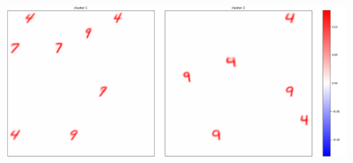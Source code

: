 \documentclass[a4paper]{report}
\begin{document}
\begin{figure} [H]
    \centering
    \includegraphics [width=\textwidth ] {c/e/1.png}
    \caption{}                                                                                                                                                                                                                                                                                                                                                                                                                                                                                                                                                                                                                                                                                                                                                                                                                                                                                                                                                                                                                                                                                                                                                                                                                                                                                                                                                                                                                                                                                                                                                                                                                                                                                                                                                                                                                                                                                                                                                                                                                                                                                                                                                                                                                                                                                                                                                                                                                                                                                                                                                                                                                                                                 
\end{figure}
\end{document}
